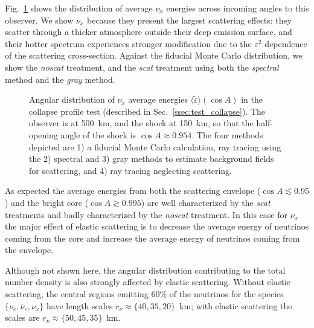 \documentclass[aps,floatfix,prd,superscriptaddress,twocolumn]{revtex4-1}
\begin{document}
Fig.~\ref{fig:avg_eps_collapse} shows the distribution of average $\nu_x$
energies across incoming angles to this observer.
We show $\nu_x$ because they present the largest scattering effects:
they scatter through a thicker atmosphere outside their deep emission surface,
and their hotter spectrum experiences stronger modification due to the
$\varepsilon^2$ dependence of the scattering cross-section.
Against the fiducial Monte Carlo distribution, we show the
\emph{noscat} treatment, and the \emph{scat} treatment using both the
\emph{spectral} method and the \emph{gray} method.

\begin{figure}
  \resizebox{\columnwidth}{!}{}
  \caption{Angular distribution of $\nu_x$ average energies
    $\langle\tilde{\varepsilon}\rangle(\cos A)$
    in the collapse profile test (described in Sec.~\ref{ssec:test_collapse}).
    The observer is at 500~km, and the shock at 150~km,
    so that the half-opening angle of the shock is $\cos A\approx0.954$.
    The four methods depicted are 1) a fiducial Monte Carlo calculation,
    ray tracing using the 2) spectral and 3) gray methods to estimate background
    fields for scattering, and 4) ray tracing neglecting scattering.
  }
  \label{fig:avg_eps_collapse}
\end{figure}

As expected the average energies from both
the scattering envelope ($\cos A \lesssim 0.95$) and
the bright core ($\cos A\gtrsim 0.995 $)
are well characterized by the \emph{scat} treatments
and badly characterized by the \emph{noscat} treatment.
In this case for $\nu_x$ the major effect of elastic scattering
is to decrease the average energy of neutrinos coming from the core
and increase the average energy of neutrinos coming from the envelope.

Although not shown here, the angular distribution contributing to the
total number density is also strongly affected by elastic scattering.
Without elastic scattering, the central regions emitting 60\%
of the neutrinos for the species $\{\nu_e,\bar{\nu}_e,\nu_x\}$
have length scales $r_\nu\approx\{40,35,20\}$~km;
with elastic scattering the scales are
$r_\nu\approx\{50,45,35\}$~km.
\end{document}
